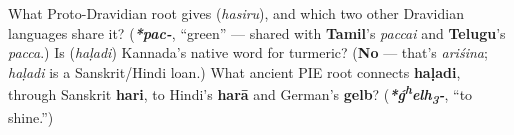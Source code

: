 \begin{tcolorbox}[breakable,colback=teal!4,colframe=teal!35!black,title={Before you move on}]
What Proto-Dravidian root gives \textbf{} (\emph{hasiru}), and which two other Dravidian languages share it? (\emph{\textbf{*pac-}}, \textquotedblleft{}green\textquotedblright{} — shared with \textbf{Tamil}'s \emph{paccai} and \textbf{Telugu}'s \emph{pacca}.) Is \textbf{} (\emph{haḷadi}) Kannada's native word for turmeric? (\textbf{No} — that's \emph{ariśina}; \emph{haḷadi} is a Sanskrit/Hindi loan.) What ancient PIE root connects \textbf{haḷadi}, through Sanskrit \textbf{hari}, to Hindi's \textbf{harā} and German's \textbf{gelb}? (\emph{\textbf{*ǵ\textsuperscript{h}elh\textsubscript{3}-}}, \textquotedblleft{}to shine.\textquotedblright{})
\end{tcolorbox}
